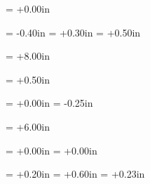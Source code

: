 \voffset        =   +0.00in %

\topmargin      =   -0.40in %
\headheight     =   +0.30in %
\headsep        =   +0.50in %

\textheight     =   +8.00in %

\footskip       =   +0.50in %

\hoffset        =   +0.00in %
\evensidemargin =   -0.25in %

\textwidth      =   +6.00in %

\marginparsep   =   +0.00in %
\marginparwidth =   +0.00in %

\parskip        =   +0.20in %
\lineskip	=   +0.60in
\linespread{1.2}            %
\baselineskip  = +0.23in
